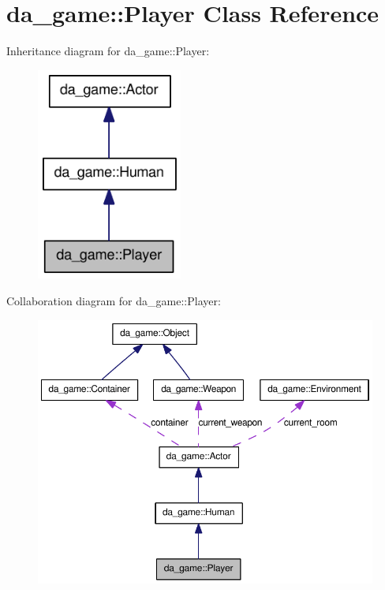 \hypertarget{classda__game_1_1Player}{
\section{da\_\-game::Player Class Reference}
\label{classda__game_1_1Player}
}
Inheritance diagram for da\_\-game::Player:\nopagebreak
\begin{figure}[H]
\begin{center}
\leavevmode
\includegraphics[width=136pt]{classda__game_1_1Player__inherit__graph}
\end{center}
\end{figure}
Collaboration diagram for da\_\-game::Player:\nopagebreak
\begin{figure}[H]
\begin{center}
\leavevmode
\includegraphics[width=394pt]{classda__game_1_1Player__coll__graph}
\end{center}
\end{figure}
